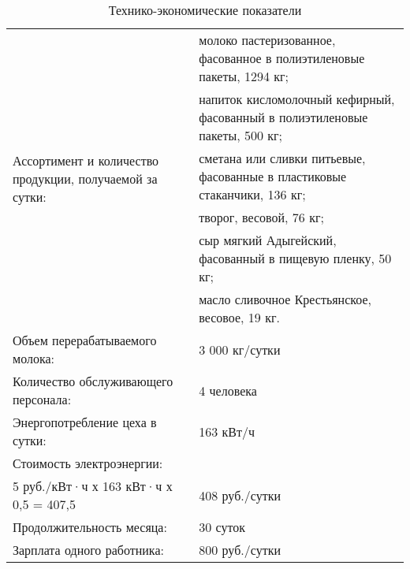 \begin{table}[]
	\small
	\centering
	\caption{Технико-экономические показатели}
	\label{my-label}
	\setlength{\extrarowheight}{0.7mm}
	\begin{tabularx}{\textwidth}{|p{8.05cm}|p{8.05cm}|}
		\hline
		\multirow{6}{8cm}{Ассортимент и количество продукции, получаемой за сутки:} & молоко пастеризованное, фасованное в полиэтиленовые пакеты, 1294 кг;     \\ %
																				& напиток кисломолочный кефирный, фасованный в полиэтиленовые пакеты, 500
																				кг; \\ %
																				& сметана или сливки питьевые, фасованные в пластиковые стаканчики, 136 кг;   \\ %
																				& творог, весовой, 76 кг;                                                    \\ %
																				& сыр мягкий Адыгейский, фасованный в пищевую пленку, 50 кг;                 \\ %
																				& масло сливочное Крестьянское, весовое, 19 кг.                              \\ \hline
		Объем перерабатываемого молока:                                         & 3 000 кг/сутки                                                      \\ \hline
		Количество обслуживающего персонала:                                    & 4 человека                                                          \\ \hline
		Энергопотребление цеха в сутки:                                         & 163 кВт/ч                                                           \\ \hline
		\multicolumn{2}{|l|}{Стоимость электроэнергии:}                                                                                               \\ \hline
		5 руб./кВт·ч х 163 кВт·ч х 0,5 = 407,5                                  & 408 руб./сутки                                                      \\ \hline
		Продолжительность месяца:                                               & 30 суток                                                            \\ \hline
		Зарплата одного работника:                                              & 800 руб./сутки                                                      \\ \hline

\end{tabularx}
\end{table}
